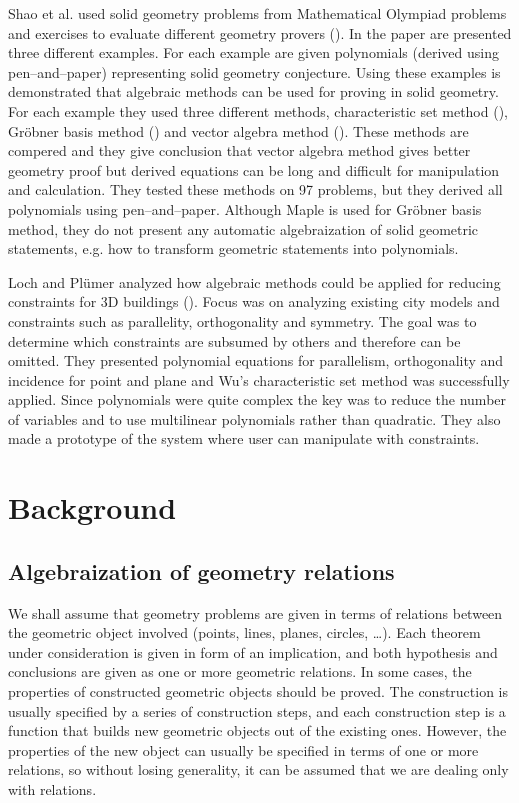\documentclass[final,1p,times,authoryear]{elsarticle}
\begin{document}
Shao et al. used solid geometry problems from Mathematical Olympiad
problems and exercises to evaluate different geometry provers
(\cite{shao2016challenging}). In the paper are presented three
different examples. For each example are given polynomials (derived
using pen--and--paper) representing solid geometry conjecture. Using
these examples is demonstrated that algebraic methods can be used for
proving in solid geometry. For each example they used three different
methods, characteristic set method (\cite{wu}), Gr\"obner basis method
(\cite{buchberger}) and vector algebra method (\cite{lord1985method}).
These methods are compered and they give conclusion that vector
algebra method gives better geometry proof but derived equations can
be long and difficult for manipulation and calculation. They tested
these methods on 97 problems, but they derived all polynomials using
pen--and--paper. Although Maple is used for Gr\"obner basis method,
they do not present any automatic algebraization of solid geometric
statements, e.g. how to transform geometric statements into
polynomials.

Loch and Pl{\"u}mer analyzed how algebraic methods could be applied
for reducing constraints for 3D buildings
(\cite{loch2009geometric}). Focus was on analyzing existing city
models and constraints such as parallelity, orthogonality and
symmetry. The goal was to determine which constraints are subsumed by
others and therefore can be omitted.  They presented polynomial
equations for parallelism, orthogonality and incidence for point and
plane and Wu's characteristic set method was successfully
applied. Since polynomials were quite complex the key was to reduce
the number of variables and to use multilinear polynomials rather than
quadratic. They also made a prototype of the system where user can
manipulate with constraints.

\section{Background}
\subsection{Algebraization of geometry relations}
We shall assume that geometry problems are given in terms of relations
between the geometric object involved (points, lines, planes, circles,
\ldots). Each theorem under consideration is given in form of an
implication, and both hypothesis and conclusions are given as one or
more geometric relations. In some cases, the properties of constructed
geometric objects should be proved. The construction is usually
specified by a series of construction steps, and each construction
step is a function that builds new geometric objects out of the
existing ones. However, the properties of the new object can usually
be specified in terms of one or more relations, so without losing
generality, it can be assumed that we are dealing only with relations.
\end{document}
